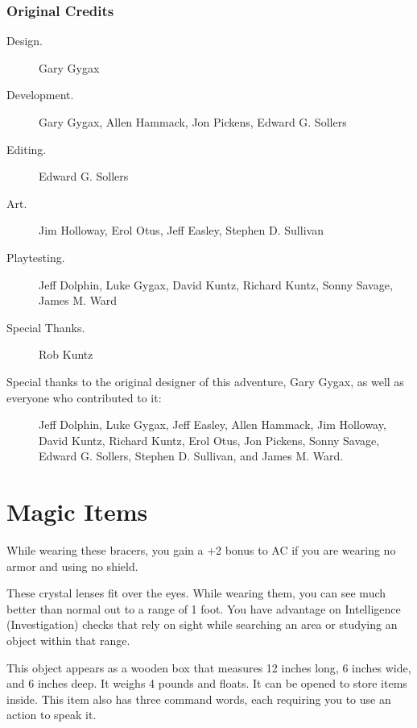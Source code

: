 \documentclass[10pt,a4paper,twoside,bg=print,twocolumn,openany,nodeprecatedcode]{dndbook}
\begin{document}
\subsection{Original Credits}

\begin{description}
\item[Design.]
Gary Gygax

\item[Development.]
Gary Gygax, Allen Hammack, Jon Pickens, Edward G. Sollers

\item[Editing.]
Edward G. Sollers

\item[Art.]
Jim Holloway, Erol Otus, Jeff Easley, Stephen D. Sullivan

\item[Playtesting.]
Jeff Dolphin, Luke Gygax, David Kuntz, Richard Kuntz, Sonny Savage, James M. Ward

\item[Special Thanks.]
Rob Kuntz

\end{description}


\begin{description}
\item[Special thanks to the original designer of this adventure, Gary Gygax, as well as everyone who contributed to it:]
Jeff Dolphin, Luke Gygax, Jeff Easley, Allen Hammack, Jim Holloway, David Kuntz, Richard Kuntz, Erol Otus, Jon Pickens, Sonny Savage, Edward G. Sollers, Stephen D. Sullivan, and James M. Ward.
\end{description}

\chapter{Magic Items}
While wearing these bracers, you gain a +2 bonus to AC if you are wearing no armor and using no shield.

These crystal lenses fit over the eyes. While wearing them, you can see much better than normal out to a range of 1 foot. You have advantage on Intelligence (Investigation) checks that rely on sight while searching an area or studying an object within that range.

This object appears as a wooden box that measures 12 inches long, 6 inches wide, and 6 inches deep. It weighs 4 pounds and floats. It can be opened to store items inside. This item also has three command words, each requiring you to use an action to speak it.
\end{document}
